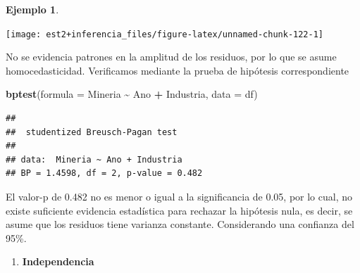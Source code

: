 \documentclass[
  11pt,
]{book}
\newenvironment{Shaded}{\begin{snugshade}}{\end{snugshade}}
\newcommand{\AttributeTok}[1]{\textcolor[rgb]{0.13,0.29,0.53}{#1}}
\newcommand{\DecValTok}[1]{\textcolor[rgb]{0.00,0.00,0.81}{#1}}
\newcommand{\FunctionTok}[1]{\textcolor[rgb]{0.13,0.29,0.53}{\textbf{#1}}}
\newcommand{\NormalTok}[1]{#1}
\newcommand{\OtherTok}[1]{\textcolor[rgb]{0.56,0.35,0.01}{#1}}
\newcommand{\SpecialCharTok}[1]{\textcolor[rgb]{0.81,0.36,0.00}{\textbf{#1}}}
\newcommand{\StringTok}[1]{\textcolor[rgb]{0.31,0.60,0.02}{#1}}
\providecommand{\tightlist}{%
  \setlength{\itemsep}{0pt}\setlength{\parskip}{0pt}}
\theoremstyle{definition}
\theoremstyle{definition}
\newtheorem{example}{Ejemplo}[chapter]
\theoremstyle{definition}
\theoremstyle{definition}
\theoremstyle{remark}
\begin{document}
\begin{example}
\begin{Shaded}
\end{Shaded}

\begin{center}\texttt{[image: est2+inferencia\_files/figure-latex/unnamed-chunk-122-1]} \end{center}

No se evidencia patrones en la amplitud de los residuos, por lo que se asume homocedasticidad. Verificamos mediante la prueba de hipótesis correspondiente

\begin{Shaded}
\begin{Highlighting}[]
\FunctionTok{bptest}\NormalTok{(}\AttributeTok{formula =}\NormalTok{ Mineria }\SpecialCharTok{\textasciitilde{}}\NormalTok{ Ano }\SpecialCharTok{+}\NormalTok{ Industria, }\AttributeTok{data =}\NormalTok{ df)}
\end{Highlighting}
\end{Shaded}

\begin{verbatim}
## 
##  studentized Breusch-Pagan test
## 
## data:  Mineria ~ Ano + Industria
## BP = 1.4598, df = 2, p-value = 0.482
\end{verbatim}

El valor-p de 0.482 no es menor o igual a la significancia de 0.05, por lo cual, no existe suficiente evidencia estadística para rechazar la hipótesis nula, es decir, se asume que los residuos tiene varianza constante. Considerando una confianza del 95\%.

\begin{enumerate}
\def\labelenumi{\arabic{enumi}.}
\setcounter{enumi}{3}
\tightlist
\item
  \textbf{Independencia}
\end{enumerate}


\end{example}
\end{document}
